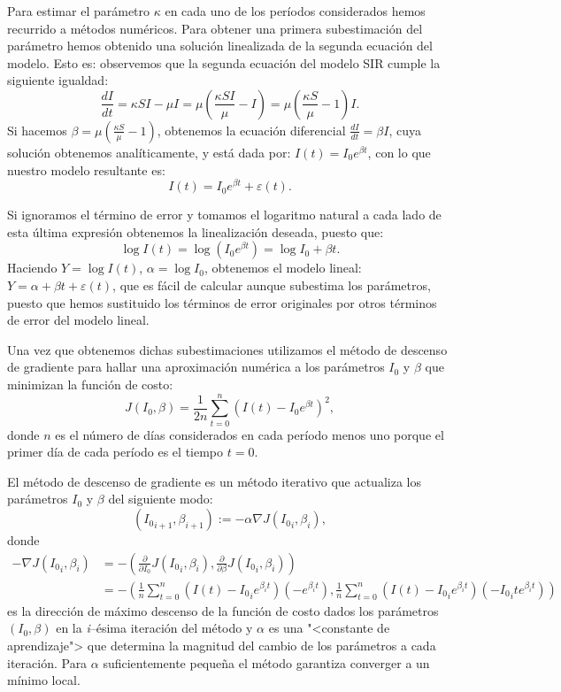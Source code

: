 \documentclass[12pt]{article}
\begin{document}
	Para estimar el parámetro $ \kappa $ en cada uno de los períodos considerados hemos recurrido a métodos numéricos. Para obtener una primera subestimación del parámetro hemos obtenido una solución linealizada de la segunda ecuación del modelo. Esto es: observemos que la segunda ecuación del modelo SIR cumple la siguiente igualdad:
	\[ \frac{dI}{dt} = \kappa SI - \mu I = \mu\left(\frac{\kappa SI}{\mu} - I\right) = \mu\left(\frac{\kappa S}{\mu} - 1\right)I. \]
	Si hacemos $ \beta = \mu\left(\frac{\kappa S}{\mu} - 1\right) $, obtenemos la ecuación diferencial $ \frac{dI}{dt} = \beta I $, cuya solución obtenemos analíticamente, y está dada por: $ I(t) = I_0e^{\beta t} $, con lo que nuestro modelo resultante es:
	\[ I(t) = I_0e^{\beta t} + \varepsilon(t) . \] 
	
	Si ignoramos el término de error y tomamos el logaritmo natural a cada lado de esta última expresión obtenemos la linealización deseada, puesto que:
	\begin{equation*}
	\log I(t) = \log(I_0 e^{\beta t}) = \log I_0 + \beta t.
	\end{equation*}
	Haciendo $ Y = \log I(t) $, $ \alpha = \log I_0 $, obtenemos el modelo lineal: $ Y = \alpha + \beta t + \varepsilon(t) $, que es fácil de calcular aunque subestima los parámetros, puesto que hemos sustituido los términos de error originales por otros términos de error del modelo lineal.
	
	Una vez que obtenemos dichas subestimaciones utilizamos el método de descenso de gradiente para hallar una aproximación numérica a los parámetros $ I_0 $ y $ \beta $ que minimizan la función de costo:
	\[ J(I_0, \beta) = \frac{1}{2n}\sum_{t=0}^{n}\left( I(t) - I_0e^{\beta t} \right)^2, \]
	donde $ n $ es el número de días considerados en cada período menos uno porque el primer día de cada período es el tiempo $ t=0 $.
	
	El método de descenso de gradiente es un método iterativo que actualiza los parámetros $ I_0 $ y $ \beta $ del siguiente modo:
	\[ ({I_0}_{i+1}, \beta_{i+1}):= -\alpha \nabla J({I_0}_i, \beta_i), \]
	donde 
	\begin{align*}
	-\nabla J({I_0}_i, \beta_i) &= -\left( \frac{\partial}{\partial I_0}J({I_0}_i, \beta_i), \frac{\partial}{\partial \beta}J({I_0}_i, \beta_i) \right) \\
	&= -\left(\frac{1}{n}\sum_{t=0}^{n}(I(t) - {I_0}_ie^{\beta_i t})(-e^{\beta_i t}),  \frac{1}{n}\sum_{t=0}^{n}(I(t) - {I_0}_ie^{\beta_i t})(-{I_0}_ite^{\beta_i t}) \right)
	\end{align*}
	es la dirección de máximo descenso de la función de costo dados los parámetros $ (I_0, \beta) $ en la \textit{i}--ésima iteración del método y $ \alpha $ es una "<constante de aprendizaje"> que determina la magnitud del cambio de los parámetros a cada iteración. Para $ \alpha $ suficientemente pequeña el método garantiza converger a un mínimo local.
	
\end{document}
